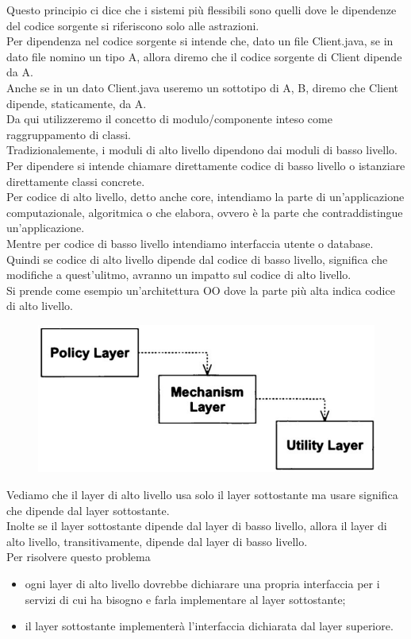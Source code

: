 Questo principio ci dice che i sistemi più flessibili sono quelli dove le dipendenze del codice sorgente si riferiscono solo alle astrazioni.\\
Per dipendenza nel codice sorgente si intende che, dato un file Client.java, se in dato file nomino un tipo A, allora diremo che il codice sorgente di Client dipende da A.\\
Anche se in un dato Client.java useremo un sottotipo di A, B, diremo che Client dipende, staticamente, da A.\\
Da qui utilizzeremo il concetto di modulo/componente inteso come raggruppamento di classi.\\
Tradizionalemente, i moduli di alto livello dipendono dai moduli di basso livello.\\
Per dipendere si intende chiamare direttamente codice di basso livello o istanziare direttamente classi concrete.\\
Per codice di alto livello, detto anche core, intendiamo la parte di un'applicazione computazionale, algoritmica o che elabora, ovvero è la parte che contraddistingue un'applicazione.\\
Mentre per codice di basso livello intendiamo interfaccia utente o database.\\
Quindi se codice di alto livello dipende dal codice di basso livello, significa che modifiche a quest'ulitmo, avranno un impatto sul codice di alto livello.\\
Si prende come esempio un'architettura OO dove la parte più alta indica codice di alto livello.\\
\begin{figure}
  \includegraphics[width=0.5\linewidth]{../immagini/principio_SOLID/architetturaOOnoDIP}  
\end{figure}

Vediamo che il layer di alto livello usa solo il layer sottostante ma usare significa che dipende dal layer sottostante.\\
Inolte se il layer sottostante dipende dal layer di basso livello, allora il layer di alto livello, transitivamente, dipende dal layer di basso livello.\\
Per risolvere questo problema
\begin{itemize}
  \item ogni layer di alto livello dovrebbe dichiarare una propria interfaccia per i servizi di cui ha bisogno e farla implementare al layer sottostante;
  \item il layer sottostante implementerà l'interfaccia dichiarata dal layer superiore.
\end{itemize}

